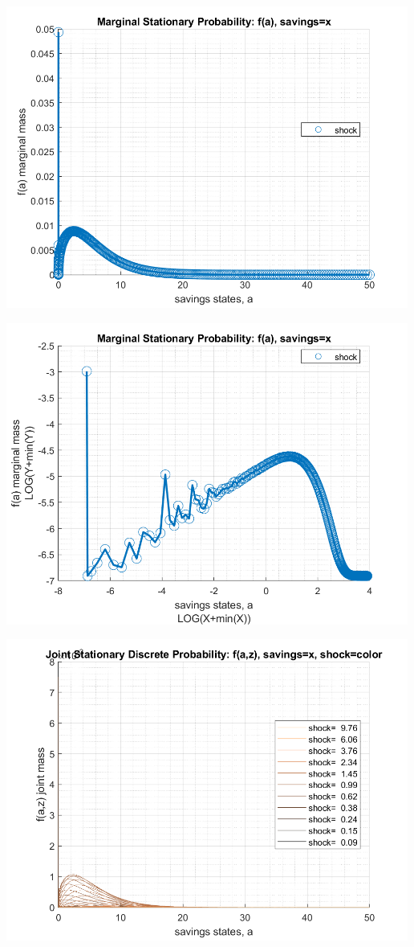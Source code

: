 \documentclass[
]{book}
\begin{document}
\includegraphics[width=5.20833in,height=\textheight]{img/fx_ds_az_cts_loop_images/figure_12.png}

\includegraphics[width=5.20833in,height=\textheight]{img/fx_ds_az_cts_loop_images/figure_13.png}

\includegraphics[width=5.20833in,height=\textheight]{img/fx_ds_az_cts_loop_images/figure_14.png}
\end{document}
